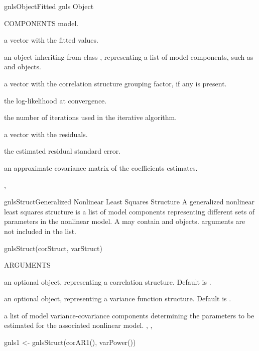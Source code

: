 \documentclass[pdftex]{article} \usepackage{url,graphicx}
\begin{document}
\begin{Helpfile}{gnlsObject}{Fitted gnls Object}
\begin{Argument}{COMPONENTS}
model.
\item[\Co{fitted:}]
a vector with the fitted values.
\item[\Co{modelStruct:}]
an object inheriting from class ,
representing a list of model components, such as  and
 objects.
\item[\Co{groups:}]
a vector with the correlation structure grouping factor,
if any is present.
\item[\Co{logLik:}]
the log-likelihood at convergence.
\item[\Co{numIter:}]
the number of iterations used in the iterative
algorithm.
\item[\Co{residuals:}]
a vector with the residuals.
\item[\Co{sigma:}]
the estimated residual standard error.
\item[\Co{varBeta:}]
an approximate covariance matrix of the
coefficients estimates.
\end{Argument}
, 
\end{Helpfile}
\begin{Helpfile}{gnlsStruct}{Generalized Nonlinear Least Squares Structure}
A generalized nonlinear least squares structure is a list of model
components representing different sets of parameters in the nonlinear 
model. A   may contain  and
 objects.  arguments are not included in the
 list.
\begin{Example}
gnlsStruct(corStruct, varStruct)
\end{Example}
\begin{Argument}{ARGUMENTS}
\item[\Co{corStruct:}]
an optional  object, representing a
correlation structure. Default is .
\item[\Co{varStruct:}]
an optional  object, representing a
variance function structure. Default is .
\end{Argument}
a list of model variance-covariance components determining the
parameters to be estimated for the associated nonlinear model.
, ,
\need 15pt
\vspace{-16pt}
\begin{Example}
gnls1 <- gnlsStruct(corAR1(), varPower())
\end{Example}
\end{Helpfile}
\end{document}
